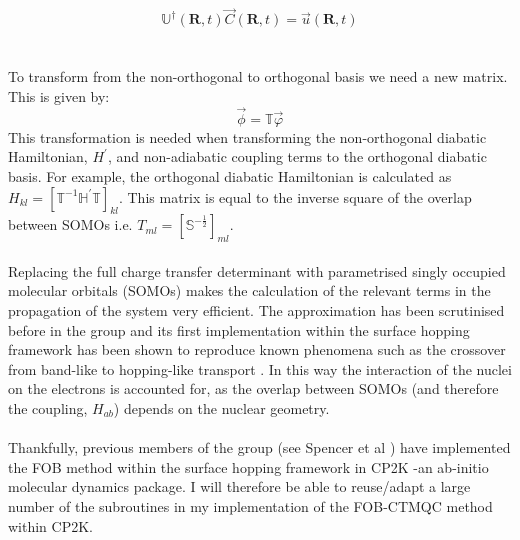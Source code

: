 \begin{equation}
  \mathbb{U}^{\dagger}(\textbf{R}, t) \vec{C}(\textbf{R}, t) = \vec{u}(\textbf{R}, t)
  \label{eq:diab_to_adiab}
\end{equation}
\\\\
To transform from the non-orthogonal to orthogonal basis we need a new matrix. This is given by:
\begin{equation}
  \vec{\phi} = \mathbb{T} \vec{\varphi}
  \label{eq:orth_to_nonorth}
\end{equation}
This transformation is needed when transforming the non-orthogonal diabatic Hamiltonian, $H^{'}$, and non-adiabatic coupling terms to the orthogonal diabatic basis. For example, the orthogonal diabatic Hamiltonian is calculated as $H_{kl} = \left[\mathbb{T}^{-1} \mathbb{H}^{'} \mathbb{T} \right]_{kl}$. This matrix is equal to the inverse square of the overlap between SOMOs i.e. $T_{ml} = [\mathbb{S}^{-\frac{1}{2}}]_{ml}$.
\\\\
Replacing the full charge transfer determinant with parametrised singly occupied molecular orbitals (SOMOs) makes the calculation of the relevant terms in the propagation of the system very efficient. The approximation has been scrutinised before in the group
\cite{giannini_crossover_2018, carof_detailed_2017, gajdos_ultrafast_2014, Gajdos2013Mar, spencer_confronting_2016, spencer_fob-sh:_2016} and its first implementation within the surface hopping framework has been shown to reproduce known phenomena such as the crossover from band-like to hopping-like transport \cite{giannini_crossover_2018}. In this way the interaction of the nuclei on the electrons is accounted for, as the overlap between SOMOs (and therefore the coupling, $H_{ab}$) depends on the nuclear geometry.
\\\\
Thankfully, previous members of the group (see Spencer et al \cite{spencer_fob-sh:_2016}) have implemented the FOB method within the surface hopping framework in CP2K -an ab-initio molecular dynamics package. I will therefore be able to reuse/adapt a large number of the subroutines in my implementation of the FOB-CTMQC method within CP2K.   
